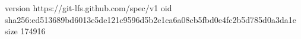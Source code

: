 version https://git-lfs.github.com/spec/v1
oid sha256:ed513689bd6013e5de121c9596d5b2e1ca6a08cb5fbd0e4fc2b5d785d0a3da1e
size 174916
